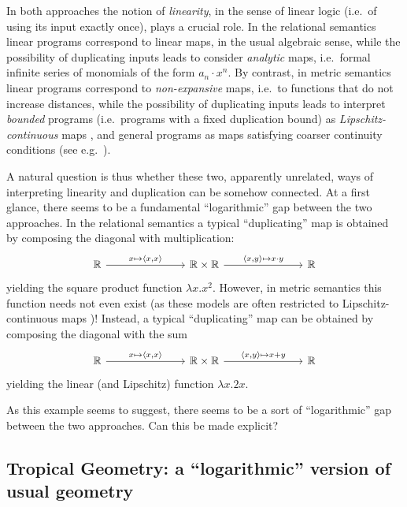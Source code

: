 In both approaches the notion of \emph{linearity}, in the sense of linear logic \cite{linearlogic} (i.e.~of using its input exactly once), plays a crucial role.
In the relational semantics linear programs correspond to linear maps, in the usual algebraic sense, while the possibility of duplicating inputs leads to consider \emph{analytic} maps, i.e.~formal infinite series of monomials of the form $a_{n}\cdot x^{n}$.
By contrast, in metric semantics linear programs correspond to \emph{non-expansive} maps, i.e.~to functions that do not increase distances, while the possibility of duplicating inputs leads to interpret \emph{bounded} programs (i.e.~programs with a fixed duplication bound) as \emph{Lipschitz-continuous} maps \cite{Gabo2017}, and general programs as maps satisfying coarser 
continuity conditions (see e.g.~\cite{LICS2021}).


A natural question is thus whether these two, apparently unrelated, ways of interpreting linearity and duplication can be somehow connected. At a first glance, there seems to be a fundamental ``logarithmic'' gap between the two approaches.
In the relational semantics a typical ``duplicating'' map is obtained by composing the diagonal with multiplication:
$$
\begin{tikzcd}
\mathbb R \ar{rrr}{x\mapsto \langle x, x\rangle}
 & &  &
 \mathbb R\times \mathbb R 
 \ar{rrr}{\langle x,y\rangle \mapsto x\cdot y}
 & & & \mathbb R
\end{tikzcd}
$$
yielding the square product function $\lambda x.x^{2}$.
However, in metric semantics this function needs not even exist (as these models are often restricted to Lipschitz-continuous maps \cite{Gabo2017})! Instead, a typical ``duplicating'' map can be obtained by composing the diagonal with the sum 
$$
\begin{tikzcd}
\mathbb R \ar{rrr}{x\mapsto \langle x, x\rangle}
 & &  &
 \mathbb R\times \mathbb R 
 \ar{rrr}{\langle x,y\rangle \mapsto x+y}
 & & & \mathbb R
\end{tikzcd}
$$
yielding the linear (and Lipschitz) function $\lambda x.2x$.

As this example seems to suggest, there seems to be a sort of ``logarithmic'' gap between the two approaches. Can this be made explicit?



\subsection{Tropical Geometry: a ``logarithmic'' version of usual geometry} 

